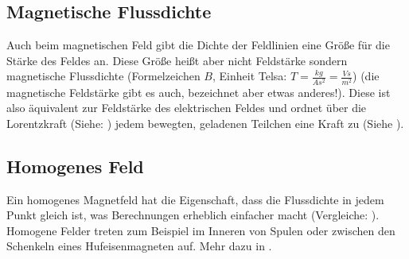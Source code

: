 \subsection{Magnetische Flussdichte}

Auch beim magnetischen Feld gibt die Dichte der Feldlinien eine Größe für die Stärke des Feldes an. Diese Größe heißt aber nicht Feldstärke sondern \glqq magnetische Flussdichte \grqq{} (Formelzeichen $B$, Einheit \glqq Telsa\grqq : $T=\frac{kg}{As^2}=\frac{Vs}{m^2}$) (die magnetische Feldstärke gibt es auch, bezeichnet aber etwas anderes!). Diese ist also äquivalent zur Feldstärke des elektrischen Feldes und ordnet über die Lorentzkraft (Siehe: ) jedem bewegten, geladenen Teilchen eine Kraft zu (Siehe ).


\subsection{Homogenes Feld} \label{subsec:MFeldHomogen}

Ein homogenes Magnetfeld hat die Eigenschaft, dass die Flussdichte in jedem Punkt gleich ist, was Berechnungen erheblich einfacher macht (Vergleiche: ). Homogene Felder treten zum Beispiel im Inneren von Spulen oder zwischen den Schenkeln eines Hufeisenmagneten auf. Mehr dazu in .

















